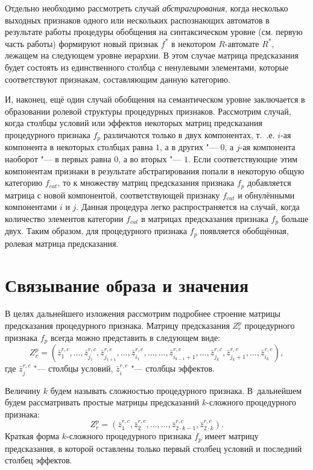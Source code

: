 \documentclass[a4paper, 12pt]{article}
\theoremstyle{plain}
\begin{document}
	Отдельно необходимо рассмотреть случай \textit{абстрагирования}, когда несколько выходных признаков одного или нескольких распознающих автоматов в результате работы процедуры обобщения на синтаксическом уровне (см. первую часть работы) формируют новый признак $f^*$ в некотором $R$-автомате $R^*$, лежащем на следующем уровне иерархии. В этом случае матрица предсказания будет состоять из единственного столбца с ненулевыми элементами, которые соответствуют признакам, составляющим данную категорию.
	
	И, наконец, ещё один случай обобщения на семантическом уровне заключается в образовании ролевой структуры процедурных признаков. Рассмотрим случай, когда столбцы условий или эффектов некоторых матриц предсказания процедурного признака $f_p$ различаются только в двух компонентах, т.~.е. $i$-ая компонента в некоторых столбцах равна $1$, а в других "--- $0$, а $j$-ая компонента наоборот "--- в первых равна $0$, а во вторых "--- $1$. Если соответствующие этим компонентам признаки в результате абстрагирования попали в некоторую общую категорию $f_{cat}$, то к множеству матриц предсказания признака $f_p$ добавляется матрица с новой компонентой, соответствующей признаку $f_{cat}$ и обнулёнными компонентами $i$ и $j$. Данная процедура легко распространяется на случай, когда количество элементов категории $f_{cat}$ в матрицах предсказания признака $f_p$ больше двух. Таким образом, для процедурного признака $f_p$ появляется обобщённая, ролевая матрица предсказания.
	\section{Связывание образа и значения}
		В целях дальнейшего изложения рассмотрим подробнее строение матрицы предсказания процедурного признака. Матрицу предсказания $Z_r^p$ процедурного признака $f_p$ всегда можно представить в следующем виде:
		\begin{equation}
		Z_r^p=(\bar z_1^{r,c},\dots,\bar z_{j_1}^{r,c},\bar z_{j_{1+1}}^{r,e},\dots,\bar z_{i_1}^{r,e},\dots,\dots,\bar z_{i_{k-1}+1}^{r,c},\dots,\bar z_{j_k}^{r,c},\bar z_{j_k+1}^{r,e},\dots,\bar z_{i_k}^{r,e}),
		\end{equation}
		где $\bar z_j^{r,c}$ "--- столбцы условий, $\bar z_i^{r,e}$ "--- столбцы эффектов. 
		
		Величину $k$ будем называть сложностью процедурного признака. В~дальнейшем будем рассматривать простые матрицы предсказаний $k$-сложного процедурного признака:
		\begin{equation}
		Z_r^p=(\bar z_1^{r,c},\bar z_2^{r,e},\dots,\dots,\bar z_{2\cdot k-1}^{r,c},\bar z_{2\cdot k}^{r,e}).
		\end{equation}
		Краткая форма $k$-сложного процедурного признака $f_p$ имеет матрицу предсказания, в которой оставлены только первый столбец условий и последний столбец эффектов.
		
\end{document}
